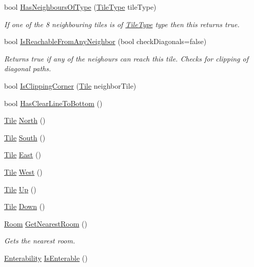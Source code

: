 \begin{DoxyCompactItemize}
\item 
bool \hyperlink{class_tile_a267a13f2e5883b4e3c4ef0352c3c738f}{Has\+Neighbours\+Of\+Type} (\hyperlink{class_tile_type}{Tile\+Type} tile\+Type)
\begin{DoxyCompactList}\small\item\em If one of the 8 neighbouring tiles is of \hyperlink{class_tile_type}{Tile\+Type} type then this returns true. \end{DoxyCompactList}\item 
bool \hyperlink{class_tile_afe9cc96998331946edf8098b56c04dee}{Is\+Reachable\+From\+Any\+Neighbor} (bool check\+Diagonals=false)
\begin{DoxyCompactList}\small\item\em Returns true if any of the neighours can reach this tile. Checks for clipping of diagonal paths. \end{DoxyCompactList}\item 
bool \hyperlink{class_tile_a3d66c8afb8475b85d84d1385e9ea2fa1}{Is\+Clipping\+Corner} (\hyperlink{class_tile}{Tile} neighbor\+Tile)
\item 
bool \hyperlink{class_tile_aafdf735f6dc8ac83724c78e311def882}{Has\+Clear\+Line\+To\+Bottom} ()
\item 
\hyperlink{class_tile}{Tile} \hyperlink{class_tile_acc0ae09e957b413c556c4afb6b4b95d5}{North} ()
\item 
\hyperlink{class_tile}{Tile} \hyperlink{class_tile_aa0e869284f94317f4f5231a239b7b4b1}{South} ()
\item 
\hyperlink{class_tile}{Tile} \hyperlink{class_tile_afb3865cdc4621002d32d863e6c3dee87}{East} ()
\item 
\hyperlink{class_tile}{Tile} \hyperlink{class_tile_afbff4f028a2b8f7a0c58726aa75aed82}{West} ()
\item 
\hyperlink{class_tile}{Tile} \hyperlink{class_tile_a2edba7e7456c987ed34a9f67bb9277b9}{Up} ()
\item 
\hyperlink{class_tile}{Tile} \hyperlink{class_tile_a339b45abc4deea7cfb2827bafae48df0}{Down} ()
\item 
\hyperlink{class_project_porcupine_1_1_rooms_1_1_room}{Room} \hyperlink{class_tile_a6d4077ccda74405aa415279515b03b32}{Get\+Nearest\+Room} ()
\begin{DoxyCompactList}\small\item\em Gets the nearest room. \end{DoxyCompactList}\item 
\hyperlink{_tile_8cs_a48a7177f465b04f310ccf25ae69d070a}{Enterability} \hyperlink{class_tile_a132d1e4646d4e5aedb7a81d6e3003c1d}{Is\+Enterable} ()

\end{DoxyCompactItemize}
